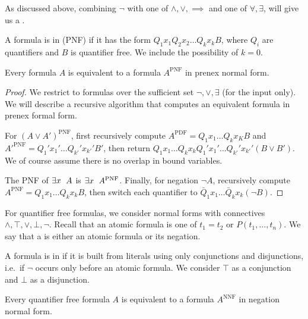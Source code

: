 As discussed above, combining $\lnot$ with one of $\land, \lor, \implies$ and
one of $\forall, \exists$, will give us a .


A formula is in  (PNF) if it has the form $Q_1 x_1 Q_2
x_2 \ldots Q_k x_k B$, where $Q_i$ are quantifiers and $B$ is quantifier free.
We include the possibility of $k = 0$.

\begin{proposition}
  Every formula $A$ is equivalent to a formula $A^{\text{PNF}}$ in prenex normal
  form.
\end{proposition}

\begin{proof}
  We restrict to formulas over the sufficient set $\lnot, \lor, \exists$ (for
  the input only).
  We will describe a recursive algorithm that computes an equivalent formula in
  prenex formal form.

  For $(A \lor A')^{\text{PNF}}$, first recursively compute $A^{\text{PDF}} = Q_1 x_1
  \ldots Q_k x_K B$ and $A'^{\text{PNF}} = Q_1' x_1' \ldots Q_{k'}' x_{k'}' B'$,
  then return $Q_1 x_1 \ldots Q_k x_k Q_1' x_1' \ldots Q_{k'}' x_{k'}' (B \lor
  B')$.
  We of course assume there is no overlap in bound variables.

  The PNF of $\exists x \;\  A$ is $\exists x \;\  A^{\text{PNF}}$.
  Finally, for negation $\lnot A$, recursively compute $A^{\text{PNF}} = Q_1 x_1
  \ldots Q_k x_k B$, then switch each quantifier to $\bar{Q}_1 x_1 \ldots
  \bar{Q}_k x_k (\lnot B)$.
\end{proof}

For quantifier free formulas, we consider normal forms with connectives $\land,
\top, \lor, \bot, \lnot$.
Recall that an atomic formula is one of $t_1 = t_2$ or $P(t_1, \ldots, t_n)$.
We say that a  is either an atomic formula or its negation.

A formula is in  if it is built from literals
using only conjunctions and disjunctions, i.e.~if $\lnot$ occurs only before an
atomic formula.
We consider $\top$ as a conjunction and $\bot$ as a disjunction.

\begin{proposition}
  Every quantifier free formula $A$ is equivalent to a formula $A^{\text{NNF}}$
  in negation normal form.
\end{proposition}


